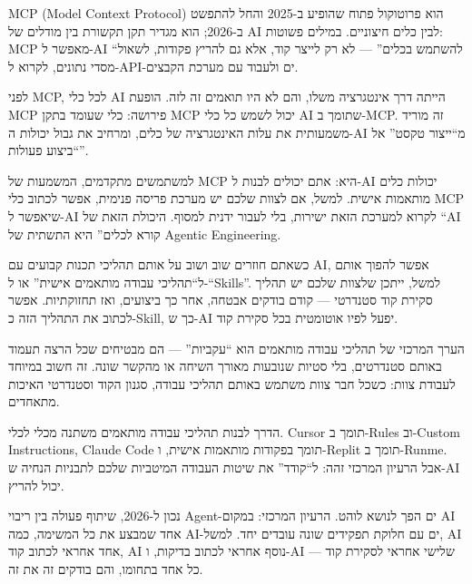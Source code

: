 


MCP (Model Context Protocol) הוא פרוטוקול פתוח שהופיע ב-2025 והחל להתפשט ב-2026; הוא מגדיר תקן תקשורת בין מודלים של AI לבין כלים חיצוניים. במילים פשוטות: MCP מאפשר ל-AI “להשתמש בכלים” — לא רק לייצר קוד, אלא גם להריץ פקודות, לשאול מסדי נתונים, לקרוא ל-API-ים ולעבוד עם מערכת הקבצים.

לפני MCP, לכל כלי AI הייתה דרך אינטגרציה משלו, והם לא היו תואמים זה לזה. הופעת MCP פירושה: כלי שעומד בתקן MCP יכול לשמש כל כלי AI שתומך ב-MCP. זה מוריד משמעותית את עלות האינטגרציה של כלים, ומרחיב את גבול יכולות ה-AI מ“ייצור טקסט” אל “ביצוע פעולות”.

למשתמשים מתקדמים, המשמעות של MCP היא: אתם יכולים לבנות ל-AI יכולות כלים מותאמות אישית. למשל, אם לצוות שלכם יש מערכת פריסה פנימית, אפשר לכתוב כלי MCP שיאפשר ל-AI לקרוא למערכת הזאת ישירות, בלי לעבור ידנית למסוף. היכולת הזאת של “AI קורא לכלים” היא התשתית של Agentic Engineering.


כשאתם חוזרים שוב ושוב על אותם תהליכי תכנות קבועים עם AI, אפשר להפוך אותם ל“תהליכי עבודה מותאמים אישית” או ל-“Skills”. למשל, ייתכן שלצוות שלכם יש תהליך סקירת קוד סטנדרטי — קודם בודקים אבטחה, אחר כך ביצועים, ואז תחזוקתיות. אפשר לכתוב את התהליך הזה כ-Skill, כך ש-AI יפעל לפיו אוטומטית בכל סקירת קוד.

הערך המרכזי של תהליכי עבודה מותאמים הוא “עקביות” — הם מבטיחים שכל הרצה תעמוד באותם סטנדרטים, בלי סטיות שנובעות מאורך השיחה או מהקשר שונה. זה חשוב במיוחד לעבודת צוות: כשכל חבר צוות משתמש באותם תהליכי עבודה, סגנון הקוד וסטנדרטי האיכות מתאחדים.

הדרך לבנות תהליכי עבודה מותאמים משתנה מכלי לכלי. Cursor תומך ב-Rules וב-Custom Instructions, Claude Code תומך בפקודות מותאמות אישית, ו-Replit תומך ב-Runme. אבל הרעיון המרכזי זהה: ל“קודד” את שיטות העבודה המיטביות שלכם לתבניות הנחיה ש-AI יכול להריץ.


נכון ל-2026, שיתוף פעולה בין ריבוי Agent-ים הפך לנושא לוהט. הרעיון המרכזי: במקום AI אחד שמבצע את כל המשימה, כמה AI-ים עם חלוקת תפקידים שונה עובדים יחד. למשל, AI אחד אחראי לכתוב קוד, AI נוסף אחראי לכתוב בדיקות, ו-AI שלישי אחראי לסקירת קוד — כל אחד בתחומו, והם בודקים זה את זה.

